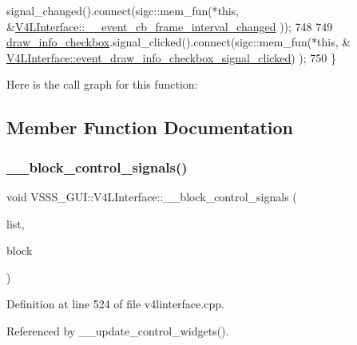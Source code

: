 \begin{DoxyCode}
      signal\_changed().connect(sigc::mem\_fun(*\textcolor{keyword}{this}, &\hyperlink{class_v_s_s_s___g_u_i_1_1_v4_l_interface_ad78e73dabab1c7caa41a45c363eef205}{V4LInterface::\_\_event\_cb\_frame\_interval\_changed}
      ));
748 
749         \hyperlink{class_v_s_s_s___g_u_i_1_1_v4_l_interface_a0bd3c429f8b0d92b2b53353dc31e346e}{draw\_info\_checkbox}.signal\_clicked().connect(sigc::mem\_fun(*\textcolor{keyword}{this}, &
      \hyperlink{class_v_s_s_s___g_u_i_1_1_v4_l_interface_a29d936ec76ebfc352060d13957255c0a}{V4LInterface::event\_draw\_info\_checkbox\_signal\_clicked})
      );
750     \}
\end{DoxyCode}
Here is the call graph for this function\+:


\subsection{Member Function Documentation}
\mbox{\label{class_v_s_s_s___g_u_i_1_1_v4_l_interface_a677d3f2d0246528bafd19cf2d3dccf98}} 
\subsubsection{\texorpdfstring{\+\_\+\+\_\+block\+\_\+control\+\_\+signals()}{\_\_block\_control\_signals()}}
{\footnotesize\ttfamily void V\+S\+S\+S\+\_\+\+G\+U\+I\+::\+V4\+L\+Interface\+::\+\_\+\+\_\+block\+\_\+control\+\_\+signals (\begin{DoxyParamCaption}\item[{std\+::list$<$ \hyperlink{namespace_v_s_s_s___g_u_i_a9eff2f5504f050458ee4bcf362482a8d}{Control\+Holder} $>$ \&}]{list,  }\item[{bool}]{block }\end{DoxyParamCaption})\hspace{0.3cm}{\ttfamily [private]}}



Definition at line 524 of file v4linterface.\+cpp.



Referenced by \+\_\+\+\_\+update\+\_\+control\+\_\+widgets().


